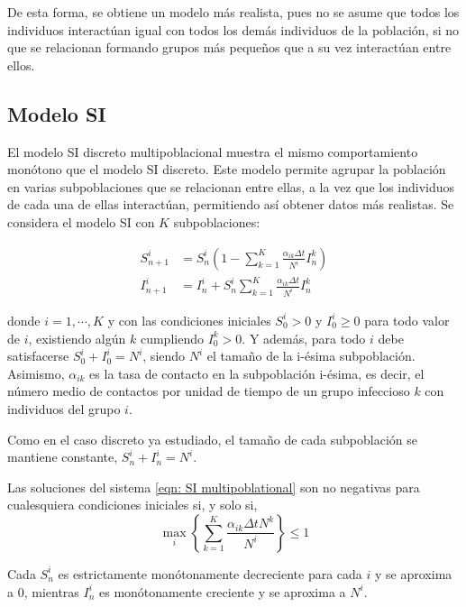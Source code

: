 De esta forma, se obtiene un modelo más realista, pues no se asume que todos los individuos interactúan igual con todos los demás individuos de la población, si no que se relacionan formando grupos más pequeños que a su vez interactúan entre ellos.

\subsection{Modelo SI}

El modelo SI discreto multipoblacional muestra el mismo comportamiento monótono que el modelo SI discreto. Este modelo permite agrupar la población en varias subpoblaciones que se relacionan entre ellas, a la vez que los individuos de cada una de ellas interactúan, permitiendo así obtener datos más realistas. Se considera el modelo SI con $K$ subpoblaciones:

\begin{equation}
\label{eqn: SI multipoblational}
\begin{aligned}
S_{n+1}^i &= S_n^i \left( 1- \sum_{k=1}^{K} \frac{\alpha_{ik}\Delta t}{N^i}I_n^k \right) \\
I_{n+1}^i &= I_n^i + S_n^i \sum_{k=1}^{K} \frac{\alpha_{ik}\Delta t}{N^i}I_n^k
\end {aligned}
\end{equation}

donde $i=1, \cdots , K$ y con las condiciones iniciales $S_0^i > 0$ y $I_0^i\geq 0$ para todo valor de $i$, existiendo algún $k$ cumpliendo $I_0^k>0$. Y además, para todo $i$ debe satisfacerse $S_0^i+I_0^i=N^i$, siendo $N^i$ el tamaño de la i-ésima subpoblación. Asimismo, $\alpha_{ik}$ es la tasa de contacto en la subpoblación i-ésima, es decir, el número medio de contactos por unidad de tiempo de un grupo infeccioso $k$ con individuos del grupo $i$.

Como en el caso discreto ya estudiado, el tamaño de cada subpoblación se mantiene constante, $S_n^i+I_n^i=N^i$.

\begin{proposition}
Las soluciones del sistema \eqref{eqn: SI multipoblational} son no negativas para cualesquiera condiciones iniciales si, y solo si,
$$\max_i \left\{ \sum_{k=1}^{K} \frac{\alpha_{ik}\Delta t N^k}{N^i} \right\} \leq 1$$
\end{proposition}

\begin{proposition}
Cada $S_n^i$ es estrictamente monótonamente decreciente para cada $i$ y se aproxima a $0$, mientras $I_n^i$ es monótonamente creciente y se aproxima a $N^i$. 
\end{proposition}



